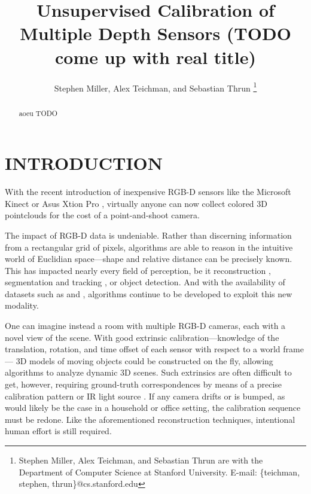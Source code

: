 \documentclass[letterpaper, 10 pt, conference]{ieeeconf}  %
\title{\LARGE \bf
Unsupervised Calibration of Multiple Depth Sensors (TODO come up with real title)}
\author{Stephen Miller, Alex Teichman, and Sebastian Thrun
\thanks{Stephen Miller, Alex Teichman, and Sebastian Thrun are with the Department of Computer Science at Stanford University. \newline E-mail: \{teichman, stephen, thrun\}@cs.stanford.edu } }
\begin{document}
\maketitle
\thispagestyle{empty}
\pagestyle{empty}


\begin{abstract}
aoeu
TODO
\end{abstract}


\section{INTRODUCTION}

With the recent introduction of inexpensive RGB-D sensors like the Microsoft Kinect \cite{kinect} or Asus Xtion Pro \cite{xtion}, virtually anyone 
can now collect colored 3D pointclouds for the cost of a point-and-shoot camera.

The impact of RGB-D data is undeniable. Rather than discerning information from a rectangular grid of pixels, algorithms 
are able to reason in the intuitive world of Euclidian space---shape and relative distance can be precisely known. 
This has impacted nearly every field of perception, be it reconstruction %
, segmentation and tracking %
, or object detection. %
And with the availability of datasets such as \cite{rgbd-dataset} and \cite{nist-dataset}, algorithms continue to 
be developed to exploit this new modality.


One can imagine instead a room with multiple RGB-D cameras, each with a novel view of the scene. With good 
extrinsic calibration---knowledge of the translation, rotation, and time offset of each sensor with respect to a world frame---
3D models of moving objects could be constructed on the fly, allowing algorithms to analyze dynamic 3D scenes. Such extrinsics 
are often difficult to get, however, requiring ground-truth correspondences by means of a precise calibration pattern 
\cite{checkerboard} or IR light source \cite{IRlight}. If any camera drifts or is bumped, as would likely be the case in 
a household or office setting, the calibration sequence must be redone. Like the aforementioned reconstruction techniques, 
intentional human effort is still required.
\end{document}
